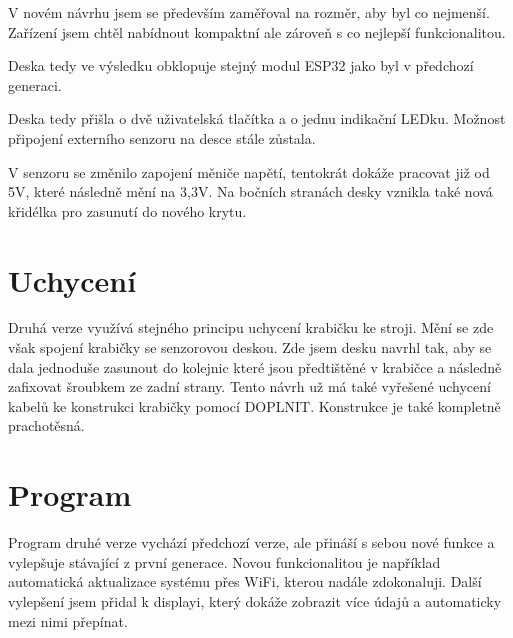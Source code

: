 V novém návrhu jsem se především zaměřoval na rozměr, aby byl co nejmenší.
Zařízení jsem chtěl nabídnout kompaktní ale zároveň s co nejlepší funkcionalitou.

Deska tedy ve výsledku obklopuje stejný modul ESP32 jako byl v předchozí generaci.

Deska tedy přišla o dvě uživatelská tlačítka a o jednu indikační LEDku. 
Možnost připojení externího senzoru na desce stále zůstala.

V senzoru se změnilo zapojení měniče napětí, tentokrát dokáže pracovat již od 5V, které následně mění na 3,3V.
Na bočních stranách desky vznikla také nová křidélka pro zasunutí do nového krytu.

\fxnote[author=JA]{\textcolor{mygreen}{krabička popis, uchycení}}
\fxnote[author=JA]{\textcolor{mygreen}{Obrázek deksa => krabička}}

\section{Uchycení}
Druhá verze využívá stejného principu uchycení krabičku ke stroji. 
Mění se zde však spojení krabičky se senzorovou deskou. 
Zde jsem desku navrhl tak, aby se dala jednoduše zasunout do kolejnic které jsou předtištěné v krabičce a následně zafixovat šroubkem ze zadní strany.
Tento návrh už má také vyřešené uchycení kabelů ke konstrukci krabičky pomocí \textcolor{mygreen}{DOPLNIT}.
Konstrukce je také kompletně prachotěsná.


\section{Program}
Program druhé verze vychází předchozí verze, ale přináší s sebou nové funkce a vylepšuje stávající z první generace.
Novou funkcionalitou je například automatická aktualizace systému přes WiFi, kterou nadále zdokonaluji.
Další vylepšení jsem přidal k displayi, který dokáže zobrazit více údajů a automaticky mezi nimi přepínat.
\newpage
